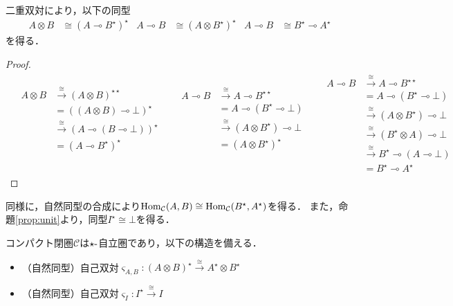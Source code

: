 \documentclass[type_judgement.tex]{subfiles}
\begin{document}
二重双対により，以下の同型
\begin{align*}
    A \otimes B &\cong (A \multimap B^\star)^\star  &  A \multimap B &\cong (A \otimes B^\star)^\star  &  A \multimap B &\cong B^\star \multimap A^\star
\end{align*}
を得る．
\begin{proof}
\begin{align*}
&\begin{aligned}
    A \otimes B &\xrightarrow{\cong} (A \otimes B)^{\star\star} \\
    &= ((A \otimes B) \multimap \bot)^\star \\
    &\xrightarrow{\cong} (A \multimap (B \multimap \bot))^\star \\
    &= (A \multimap B^\star)^\star \\
    & \\
    &
\end{aligned}
&
&\begin{aligned}
    A \multimap B &\xrightarrow{\cong} A \multimap B^{\star\star} \\
    &= A \multimap (B^\star \multimap \bot) \\
    &\xrightarrow{\cong} (A \otimes B^\star) \multimap \bot \\
    &= (A \otimes B^\star)^\star \\
    & \\
    &
\end{aligned}
&
&\begin{aligned}
    A \multimap B &\xrightarrow{\cong} A \multimap B^{\star\star} \\
    &= A \multimap (B^\star \multimap \bot) \\
    &\xrightarrow{\cong} (A \otimes B^\star) \multimap \bot \\
    &\xrightarrow{\cong} (B^\star \otimes A) \multimap \bot \\
    &\xrightarrow{\cong} B^\star \multimap (A \multimap \bot) \\
    &= B^\star \multimap A^\star
\end{aligned}
\end{align*}
\end{proof}

同様に，自然同型の合成により$\mathop{\mathrm{Hom}}\nolimits_\mathcal{C}(A,B) \cong \mathop{\mathrm{Hom}}\nolimits_\mathcal{C}(B^\star, A^\star)$を得る．
また，命題\ref{prop:unit}より，同型$I^\star \cong \bot$を得る．

\begin{defn}
コンパクト閉圏$\mathcal{C}$は$\star\mathchar`-$自立圏であり，以下の構造を備える．
\begin{itemize}
    \item （自然同型）自己双対$\varsigma_{A,B}:(A \otimes B)^\star \xrightarrow{\cong} A^\star \otimes B^\star$
    \item （自然同型）自己双対$\varsigma_I:I^\star \xrightarrow{\cong} I$
\end{itemize}
\end{defn}
\end{document}
